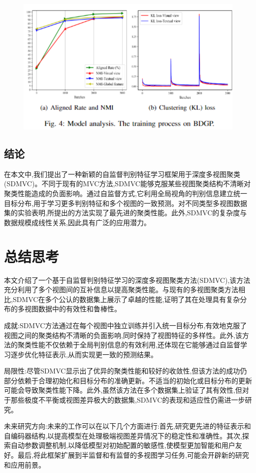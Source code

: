 \documentclass{article}
\begin{document}
\begin{figure}[h]
    \centering
    \includegraphics[width=0.75\linewidth]{./imgs/img4.png}
\end{figure}


\subsection{结论}
在本文中,我们提出了一种新颖的自监督判别特征学习框架用于深度多视图聚类 (SDMVC)。不同于现有的MVC方法,SDMVC能够克服某些视图聚类结构不清晰对聚类性能造成的负面影响。通过自监督方式,它利用全局视角的判别信息建立统一目标分布,用于学习更多判别特征和多个视图的一致预测。对不同类型多视图数据集的实验表明,所提出的方法实现了最先进的聚类性能。此外,SDMVC的复杂度与数据规模成线性关系,因此具有广泛的应用潜力。


\newpage

\section{总结思考}
本文介绍了一个基于自监督判别特征学习的深度多视图聚类方法(SDMVC),该方法充分利用了多个视图间的互补信息以提高聚类性能。与现有的多视图聚类方法相比,SDMVC在多个公认的数据集上展示了卓越的性能,证明了其在处理具有复杂分布的多视图数据中的有效性和鲁棒性。

成就:SDMVC方法通过在每个视图中独立训练并引入统一目标分布,有效地克服了视图之间的聚类结构不清晰的负面影响,同时保持了视图特征的多样性。此外,该方法的聚类性能不仅依赖于全局判别信息的有效利用,还体现在它能够通过自监督学习逐步优化特征表示,从而实现更一致的预测结果。

局限性:尽管SDMVC显示出了优异的聚类性能和较好的收敛性,但该方法的成功仍部分依赖于合理初始化和目标分布的准确更新。不适当的初始化或目标分布的更新可能会导致聚类性能下降。此外,虽然该方法在多个数据集上验证了其有效性,但对于那些极度不平衡或视图差异极大的数据集,SDMVC的表现和适应性仍需进一步研究。

未来研究方向:未来的工作可以在以下几个方面进行:首先,研究更先进的特征表示和自编码器结构,以提高模型在处理极端视图差异情况下的稳定性和准确性。其次,探索自动参数调整机制,以降低模型对初始配置的敏感性,使模型更加智能和用户友好。最后,将此框架扩展到半监督和有监督的多视图学习任务,可能会开辟新的研究和应用前景。
\end{document}

